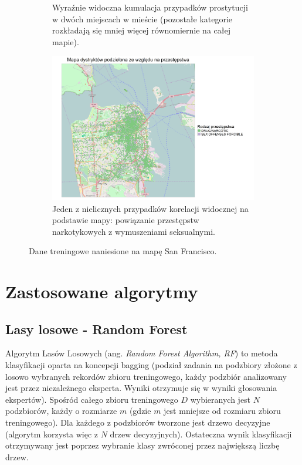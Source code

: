 \documentclass[11pt]{article} %
\begin{document}
\begin{figure}[!h]
\begin{subfigure}{0.48\linewidth}
   \caption{Wyraźnie widoczna kumulacja przypadków prostytucji w dwóch miejscach w mieście (pozostałe kategorie rozkładają się mniej więcej równomiernie na całej mapie).}
   \label{fig:sf_crimes_prostitution} 
\end{subfigure}
\hfill
\begin{subfigure}{0.48\linewidth}
   \centering
   \includegraphics[width=\linewidth]{images/sf_crimes_4}
   \caption{Jeden z nielicznych przypadków korelacji widocznej na podstawie mapy: powiązanie przestępstw narkotykowych z wymuszeniami seksualnymi.}
   \label{fig:sf_crimes_drugs}
\end{subfigure}
\centering
\caption{Dane treningowe naniesione na mapę San Francisco.}
\end{figure}

\clearpage

\section{Zastosowane algorytmy}
\subsection{Lasy losowe - Random Forest}

Algorytm Lasów Losowych (ang. \textit{Random Forest Algorithm, RF}) to metoda klasyfikacji oparta na koncepcji bagging (podział zadania na podzbiory złożone z losowo wybranych rekordów zbioru treningowego, każdy podzbiór analizowany jest przez niezależnego eksperta. Wyniki otrzymuje się w wyniki głosowania ekspertów). Spośród całego zbioru treningowego $D$ wybieranych jest $N$ podzbiorów, każdy o rozmiarze $m$ (gdzie $m$ jest mniejsze od rozmiaru zbioru treningowego). Dla każdego z podzbiorów tworzone jest drzewo decyzyjne (algorytm korzysta więc z $N$ drzew decyzyjnych). Ostateczna wynik klasyfikacji otrzymywany jest poprzez wybranie klasy zwróconej przez największą liczbę drzew.\\
\end{document}

